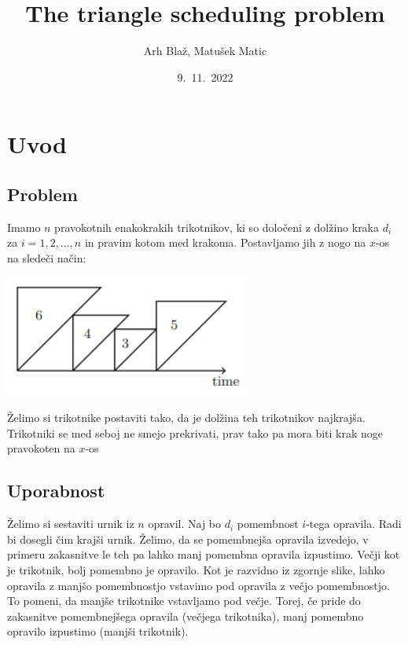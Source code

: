 \documentclass[a4paper,12pt]{article}
\theoremstyle{definition}
\theoremstyle{plain}
\begin{document}
\begin{titlepage}

\title{The triangle scheduling problem}
\author{Arh Blaž, Matušek Matic}
\date{9.\ 11.\ 2022}
\maketitle   
\thispagestyle{empty}
\end{titlepage}

\section{Uvod}
\subsection{Problem}

Imamo $n$ pravokotnih enakokrakih trikotnikov, ki so določeni z dolžino kraka $d_i$ za $i=1,2,...,n$  in pravim kotom med krakoma. Postavljamo jih z nogo na $x$-os na sledeči način:
\begin{center}
   \includegraphics[width=8cm, height=4cm]{primer_trikotnikov.png} 
\end{center}
Želimo si trikotnike postaviti tako, da je dolžina teh trikotnikov najkrajša. Trikotniki se med seboj ne smejo prekrivati,
prav tako pa mora biti krak noge pravokoten na $x$-os

\subsection{Uporabnost}
Želimo si sestaviti urnik iz $n$ opravil. Naj bo $d_i$ pomembnost $i$-tega opravila. Radi bi dosegli čim krajši urnik. Želimo, da se pomembnejša opravila izvedejo, v primeru zakasnitve le teh pa lahko manj pomembna opravila izpustimo.
Večji kot je trikotnik, bolj pomembno je opravilo. Kot je razvidno iz zgornje slike, lahko opravila z manjšo pomembnostjo vstavimo pod opravila z večjo pomembnostjo. To pomeni, da manjše trikotnike vstavljamo pod večje. Torej, če pride do zakasnitve
pomembnejšega opravila (večjega trikotnika), manj pomembno opravilo  izpustimo (manjši trikotnik).
\end{document}
